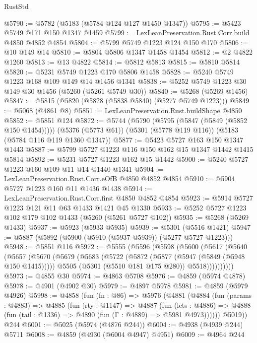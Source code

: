 \begin{lexlean}{RustStd}
\begin{coremodule}
@5790 := @5782 (@5183 (@5784 @124 @127 @1450 @1347))
@5795 := @5423 @5749 @171 @150 @1347 @1459
@5799 := LexLeanPreservation.Rust.Corr.build @4850 @4852 @4854
@5804 := @5799 @5749 @1223 @124 @150 @170
@5806 := @10 @149 @14
@5810 := @5804 @5806 @1347 @1458 @1454
@5812 := @2 @4822 @1260
@5813 := @13 @4822
@5814 := @5812 @5813
@5815 := @5810 @5814
@5820 := @5231 @5749 @1223 @170 @5806 @1458
@5828 := @5240 @5749 @1223 @168 @109 @149 @14 @1456 @1341
@5838 := @5252 @5749 @1223 @30 @149 @30 @1456 (@5260 (@5261 @5749 @30))
@5840 := @5268 (@5269 @1456)
@5847 := @5815 (@5820 (@5828 (@5838 @5840) (@5277 @5749 @1223)))
@5849 := @5068 (@4861 @8)
@5851 := LexLeanPreservation.Rust.buildShape @4850
@5852 := @5851 @124
@5872 := @5744
    (@5790 (@5795 (@5847 (@5849 (@5852 @150 @1454)))))
    (@5376 (@5773 @61))
    (@5301 (@5778 @119 @116))
    (@5183 (@5784 @116 @119 @1360 @1347))
@5877 := @5423 @5727 @163 @150 @1347 @1443
@5887 := @5799 @5727 @1223 @116 @150 @162 @15 @1347 @1442 @1415 @5814
@5892 := @5231 @5727 @1223 @162 @15 @1442
@5900 := @5240 @5727 @1223 @160 @109 @11 @14 @1440 @1341
@5904 := LexLeanPreservation.Rust.Corr.eOfB @4850 @4852 @4854
@5910 := @5904 @5727 @1223 @160 @11 @1436 @1438
@5914 := LexLeanPreservation.Rust.Corr.first @4850 @4852 @4854
@5923 := @5914 @5727 @1223 @121 @11 @63 @1433 @1421 @45 @1330
@5933 := @5252 @5727 @1223 @102 @179 @102 @1433 (@5260 (@5261 @5727 @102))
@5935 := @5268 (@5269 @1433)
@5937 := @5923 (@5933 @5935)
@5939 := @5301 (@5516 @1421)
@5947 := @5887 (@5892 (@5900 (@5910 (@5937 @5939)) (@5277 @5727 @1223)))
@5948 := @5851 @116
@5972 := @5555
    (@5596
      (@5598
        (@5600
          (@5617
            (@5640
              (@5657
                (@5670
                  (@5679
                    (@5683
                      (@5722
                        (@5872 (@5877 (@5947 (@5849 (@5948 @150 @1415)))))
                        @5505
                        (@5301 (@5510 @181 @175 @280))
                        @5518))))))))))
@5973 := @4855 @30
@5974 := @4863 @5708
@5976 := @4859 (@5974 @4878)
@5978 := @4901 (@4902 @30)
@5979 := @4897 @5978
@5981 := @4859 (@5979 @4926)
@5998 := @4858
    (fun (fn : @86) =>
    @5976
      (@4881
        (@4884
          (fun (params : @4883) =>
          @4885
            (fun (rty : @1147) =>
            @4887
              (fun (lets : @4886) =>
              @4888 (fun (tail : @1336) => @4890 (fun (Γ : @4889) => @5981 @4973))))))
        @5019))
    @244
@6001 := @5025 (@5974 (@4876 @244))
@6004 := @4938 (@4939 @244) @5711
@6008 := @4859 (@4930 (@6004 @4947) @4951)
@6009 := @4964 @244

\end{coremodule}
\end{lexlean}

